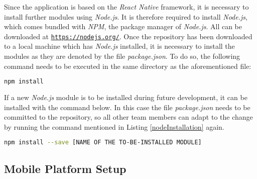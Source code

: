 Since the application is based on the \textit{React Native} framework, it is necessary to install further modules using \textit{Node.js}. It is therefore required to install \textit{Node.js}, which comes bundled with \textit{NPM}, the package manager of \textit{Node.js}. All can be downloaded at \href{https://nodejs.org/}{\nolinkurl{https://nodejs.org/}}.
\newline
Once the repository has been downloaded to a local machine which has \textit{Node.js} installed, it is necessary to install the modules as they are denoted by the file \textit{package.json}. To do so, the following command needs to be executed in the same directory as the aforementioned file:

\begin{lstlisting}[language=bash,caption=Node.js Installation,label=nodeInstallation]
npm install
\end{lstlisting}

If a new \textit{Node.js} module is to be installed during future development, it can be installed with the command below. In this case the file \textit{package.json} needs to be committed to the repository, so all other team members can adapt to the change by running the command mentioned in Listing \ref{nodeInstallation} again.

\begin{lstlisting}[language=bash,caption=Node.js Installation of a specific module,label=nodeInstallationSpecificModule]
npm install --save [NAME OF THE TO-BE-INSTALLED MODULE]
\end{lstlisting}

\subsection{Mobile Platform Setup}
\label{ssec:mobile}

